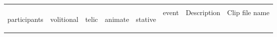 \noindent
\begin{tabularx}{\textwidth}{llllllQl}
\lsptoprule
\\[.4cm] %
\begin{rotate}{30}participants\end{rotate} 		& \begin{rotate}{30}volitional\end{rotate} 		& \begin{rotate}{30}telic\end{rotate} 		& \begin{rotate}{30}animate\end{rotate} 		& \begin{rotate}{30}stative\end{rotate} 		&  event 	&Description 									&Clip file name \\


\end{tabularx}
